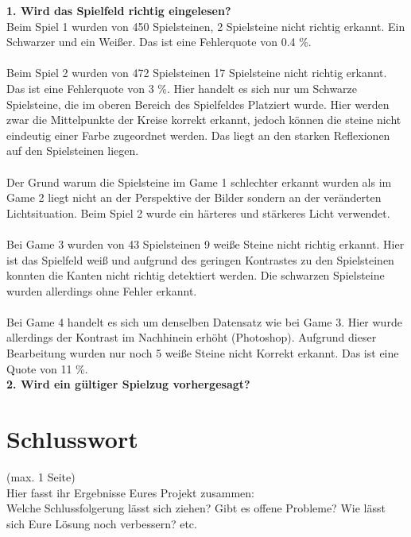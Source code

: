 \documentclass[paper=A4, deutsch]{scrartcl}
\begin{document}
\textbf{1. Wird das Spielfeld richtig eingelesen?} \\
Beim Spiel 1 wurden von 450 Spielsteinen, 2 Spielsteine nicht richtig erkannt. Ein Schwarzer und ein Weißer. Das ist eine Fehlerquote von 0.4 \%. \\
\\
Beim Spiel 2 wurden von 472 Spielsteinen 17 Spielsteine nicht richtig erkannt. Das ist eine Fehlerquote von 3 \%. Hier handelt es sich nur um Schwarze Spielsteine, die im oberen Bereich des Spielfeldes Platziert wurde. Hier werden zwar die Mittelpunkte der Kreise korrekt erkannt, jedoch können die steine nicht eindeutig einer Farbe zugeordnet werden. Das liegt an den starken Reflexionen auf den Spielsteinen liegen. \\ 
\\
Der Grund warum die Spielsteine im Game 1 schlechter erkannt wurden als im Game 2 liegt nicht an der Perspektive der Bilder sondern an der veränderten Lichtsituation. Beim Spiel 2 wurde ein härteres und stärkeres Licht verwendet. \\
\\
Bei Game 3 wurden von 43 Spielsteinen 9 weiße Steine nicht richtig erkannt. Hier ist das Spielfeld weiß und aufgrund des geringen Kontrastes zu den Spielsteinen konnten die Kanten nicht richtig detektiert werden. Die schwarzen Spielsteine wurden allerdings ohne Fehler erkannt. \\
\\
Bei Game 4 handelt es sich um denselben Datensatz wie bei Game 3. Hier wurde allerdings der Kontrast im Nachhinein erhöht (Photoshop). Aufgrund dieser Bearbeitung wurden nur noch 5 weiße Steine nicht Korrekt erkannt. Das ist eine Quote von 11 \%.
\\



\textbf{2. Wird ein gültiger Spielzug vorhergesagt?}


\section{Schlusswort}
(max. 1 Seite)\\
Hier fasst ihr Ergebnisse Eures Projekt zusammen:\\
Welche Schlussfolgerung lässt sich ziehen? Gibt es offene Probleme? Wie lässt sich Eure Lösung noch verbessern? etc.
\end{document}
